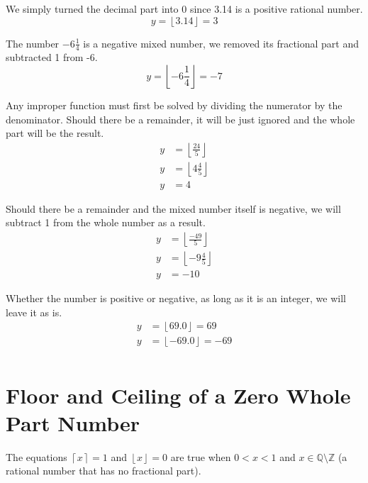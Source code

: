 \documentclass[twoside,openany,12pt]{book}
\begin{document}
    We simply turned the decimal part into 0 since 3.14 is a positive rational number.
    \begin{equation*}
        y = \left\lfloor 3.14 \right\rfloor = 3
    \end{equation*}

    The number $-6\frac{1}{4}$ is a negative mixed number, we removed its fractional part and subtracted 1 from -6.
    \begin{equation*}
        y = \left\lfloor -6\frac{1}{4} \right\rfloor = -7
    \end{equation*}

    Any improper function must first be solved by dividing the numerator by the denominator. Should there be a remainder, it will be just ignored and the whole part will be the result.
    \begin{equation*}
        \begin{split}
            y &= \left\lfloor \frac{24}{5} \right\rfloor \\
            y &= \left\lfloor 4\frac{4}{5} \right\rfloor \\
            y &= 4
        \end{split}
    \end{equation*}

    Should there be a remainder and the mixed number itself is negative, we will subtract 1 from the whole number as a result.
    \begin{equation*}
        \begin{split}
            y &= \left\lfloor \frac{-49}{5} \right\rfloor \\
            y &= \left\lfloor -9\frac{4}{5} \right\rfloor \\
            y &= -10
        \end{split}
    \end{equation*}

    Whether the number is positive or negative, as long as it is an integer, we will leave it as is.
    \begin{equation*}
        \begin{split}
            y &= \left\lfloor 69.0 \right\rfloor = 69\\
            y &= \left\lfloor -69.0 \right\rfloor = -69\\
        \end{split}
    \end{equation*}

    \section{Floor and Ceiling of a Zero Whole Part Number}
    The equations $\left\lceil x \right\rceil = 1$ and $\left\lfloor x \right\rfloor = 0$ are true when $0 < x < 1$ and $x \in \mathbb{Q} \setminus \mathbb{Z}$ (a rational number that has no fractional part).
\end{document}
